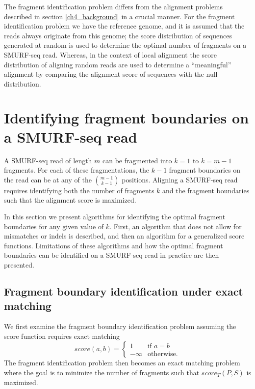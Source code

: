 The fragment identification problem differs from the alignment problems
described in section \ref{ch4_background} in a crucial manner. For the
fragment identification problem we have the reference genome, and it is
assumed that the reads always originate from this genome; the score
distribution of sequences generated at random is used to determine the
optimal number of fragments on a SMURF-seq read. Whereas, in the context
of local alignment the score distribution of aligning random reads are
used to determine a ``meaningful'' alignment by comparing the alignment
score of sequences with the null distribution.



\section{Identifying fragment boundaries on a SMURF-seq read}
\label{frag_bound_id}
A SMURF-seq read of length $m$ can be fragmented into $k=1$ to $k=m-1$
fragments. For each of these fragmentations, the $k-1$ fragment
boundaries on the read can be at any of the $m-1 \choose k-1$ positions.
Aligning a SMURF-seq read requires identifying both the number of
fragments $k$ and the fragment boundaries such that the alignment score
is maximized.

In this section we present algorithms for identifying the optimal
fragment boundaries for any given value of $k$. First, an algorithm that
does not allow for mismatches or indels is described, and then an
algorithm for a generalized score functions. Limitations of these
algorithms and how the optimal fragment boundaries can be identified on
a SMURF-seq read in practice are then presented.

\subsection{Fragment boundary identification under exact matching}
We first examine the fragment boundary identification problem assuming
the score function requires exact matching
\[score(a,b)=
\begin{cases}
  1 & \text{if } a = b \\
  -\infty & \text{otherwise.}
\end{cases}\]
The fragment identification problem then becomes an exact matching
problem where the goal is to minimize the number of fragments such that
$score_T(P,S)$ is maximized.


